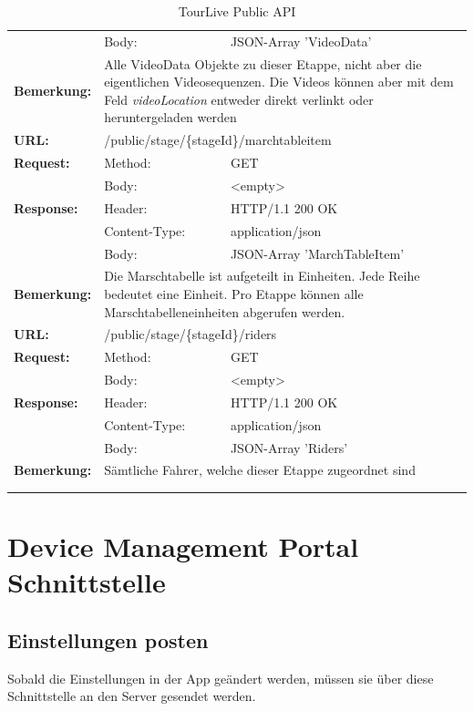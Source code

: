 {\begin{longtable}{ p{2.5cm} p{3.5cm} p{6cm}}
		& Body: & JSON-Array 'VideoData'\\
	\textbf{Bemerkung:} & \multicolumn{2}{p{10cm}}{Alle VideoData Objekte zu dieser Etappe, nicht aber die eigentlichen Videosequenzen. Die Videos können aber mit dem Feld \textit{videoLocation} entweder direkt verlinkt oder heruntergeladen werden} \\
\hline
\hline
	\textbf{URL:} & \multicolumn{2}{l}{/public/stage/\{stageId\}/marchtableitem} \\
	\textbf{Request:} & Method: & GET \\
		& Body: & <empty>\\
	\textbf{Response:} &  Header: & HTTP/1.1 200 OK \\
		& Content-Type: & application/json \\
		& Body: & JSON-Array 'MarchTableItem'\\
	\textbf{Bemerkung:} & \multicolumn{2}{p{10cm}}{Die Marschtabelle ist aufgeteilt in Einheiten. Jede Reihe bedeutet eine Einheit. Pro Etappe können alle Marschtabelleneinheiten abgerufen werden.} \\
\hline
\hline
	\textbf{URL:} & \multicolumn{2}{l}{/public/stage/\{stageId\}/riders} \\
	\textbf{Request:} & Method: & GET \\
		& Body: & <empty>\\
	\textbf{Response:} &  Header: & HTTP/1.1 200 OK \\
		& Content-Type: & application/json \\
		& Body: & JSON-Array 'Riders'\\
	\textbf{Bemerkung:} & \multicolumn{2}{p{10cm}}{Sämtliche Fahrer, welche dieser Etappe zugeordnet sind} \\
\hline
\hline \\
\caption{TourLive Public API}
\end{longtable}}

\section{Device Management Portal Schnittstelle}

\subsection{Einstellungen posten}
Sobald die Einstellungen in der App geändert werden, müssen sie über diese Schnittstelle an den Server gesendet werden.

